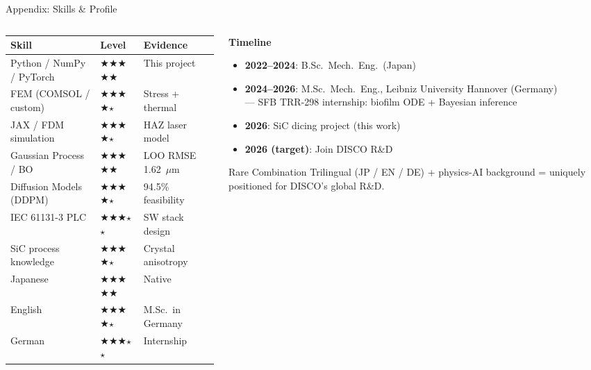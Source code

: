 \documentclass[aspectratio=169,11pt]{beamer}
\newcommand{\starfull}{\ensuremath{\bigstar}}
\newcommand{\starempty}{\ensuremath{\star}}
\newcommand{\ratingV}{\starfull\starfull\starfull\starfull\starfull}
\newcommand{\ratingIV}{\starfull\starfull\starfull\starfull\starempty}
\newcommand{\ratingIII}{\starfull\starfull\starfull\starempty\starempty}
\begin{document}
\begin{frame}[shrink=10]{Appendix: Skills \& Profile}
  \begin{columns}[T]
    \begin{column}{0.54\textwidth}
      \small
      \begin{tabular}{lll}
        \toprule
        \textbf{Skill} & \textbf{Level} & \textbf{Evidence} \\
        \midrule
        Python / NumPy / PyTorch & \ratingV   & This project \\
        FEM (COMSOL / custom)    & \ratingIV  & Stress + thermal \\
        JAX / FDM simulation     & \ratingIV  & HAZ laser model \\
        Gaussian Process / BO    & \ratingV   & LOO RMSE 1.62~$\mu$m \\
        Diffusion Models (DDPM)  & \ratingIV  & 94.5\% feasibility \\
        IEC 61131-3 PLC          & \ratingIII & SW stack design \\
        SiC process knowledge    & \ratingIV  & Crystal anisotropy \\
        Japanese                 & \ratingV   & Native \\
        English                  & \ratingIV  & M.Sc.\ in Germany \\
        German                   & \ratingIII & Internship \\
        \bottomrule
      \end{tabular}
    \end{column}
    \begin{column}{0.42\textwidth}
      \textbf{Timeline}
      \begin{itemize}
        \item \textbf{2022--2024}: B.Sc.\ Mech.\ Eng.\ (Japan)
        \item \textbf{2024--2026}: M.Sc.\ Mech.\ Eng.,
              Leibniz University Hannover (Germany)\\
              --- SFB TRR-298 internship: biofilm ODE +
              Bayesian inference
        \item \textbf{2026}: SiC dicing project (this work)
        \item \textbf{2026 (target)}: Join DISCO R\&D
      \end{itemize}

      \vspace{0.5em}
      \begin{block}{Rare Combination}
        \small
        Trilingual (JP / EN / DE) + physics-AI background
        = uniquely positioned for DISCO's global R\&D.
      \end{block}
    \end{column}
  \end{columns}
\end{frame}

\end{document}
